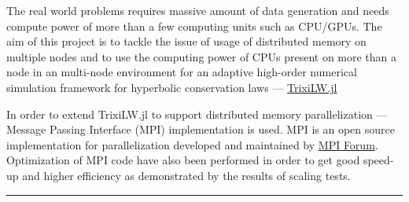 
The real world problems requires massive amount of data generation and needs compute power of more than a few computing units such as CPU/GPUs. The aim of this project is to tackle the issue of usage of distributed memory on multiple nodes and to use the computing power of CPUs present on more than a node in an multi-node environment for an adaptive high-order numerical simulation framework for hyperbolic conservation laws --- \href{https://www.example.com}{\ttfamily TrixiLW.jl} \vspace{15pt}

In order to extend {\ttfamily TrixiLW.jl} to support distributed memory parallelization --- Message Passing Interface (MPI) implementation is used. MPI is an open source implementation for parallelization developed and maintained by \href{https://www.mpi-forum.org/}{MPI Forum}. Optimization of MPI code have also been performed in order to get good speed-up and higher efficiency as demonstrated by the results of scaling tests.

\begin{center}
    \rule{3cm}{1pt}
\end{center}
